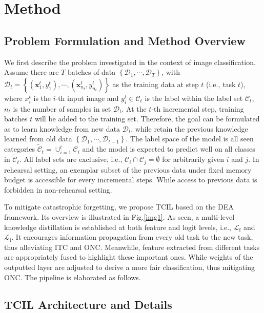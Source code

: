\documentclass[letterpaper]{article} %
\begin{document}
\section{Method}

\subsection{Problem Formulation and Method Overview}
We first describe the problem investigated in the context of image classification. Assume there are $T$ batches of data $\left\{\mathcal{D}_{1}, \cdots, \mathcal{D}_{T}\right\}$, with $\mathcal{D}_{t}=\left\{\left(\mathbf{x}_{1}^{t}, y_{1}^{t}\right), \cdots,\left(\mathbf{x}_{n_{t}}^{t}, y_{n_{t}}^{t}\right)\right\}$ as the training data at step $t$ (i.e., task $t$), where ${x}_{i}^{t}$ is the $i$-th input image and $y_{i}^{t} \in \mathcal{C}_{t}$ is the label within the label set $\mathcal{C}_{t}$, $n_{t}$ is the number of samples in set $\mathcal{D}_{t}$. At the $t$-th incremental step, training batches $t$ will be added to the training set. Therefore, the goal can be formulated as to learn knowledge from new data $\mathcal{D}_{t}$, while retain the previous knowledge learned from old data $\left\{\mathcal{D}_{1}, \cdots, \mathcal{D}_{t-1}\right\}$. The label space of the model is all seen categories $\tilde{\mathcal{C}}_{t}=\cup_{i=1}^{t} \mathcal{C}_{i}$ and the model is expected to predict well on all classes in $\tilde{\mathcal{C}}_{t}$. All label sets are exclusive, i.e., $\mathcal{C}_{i} \cap \mathcal{C}_{j}=\emptyset$ for arbitrarily given $i$ and $j$. In rehearsal setting, an exemplar subset of the previous data under fixed memory budget is accessible for every incremental steps. While access to previous data is forbidden in non-rehearsal setting.

To mitigate catastrophic forgetting, we propose TCIL based on the DEA framework. Its overview is illustrated in Fig.\ref{img1}. As seen, a multi-level knowledge distillation is established at both feature and logit levels, i.e., $\mathcal{L}_{\mathrm{f}}$ and $\mathcal{L}_{\mathrm{l}}$. It encourages information propagation from every old task to the new task, thus alleviating ITC and ONC. Meanwhile, feature extracted from different tasks are appropriately fused to highlight these important ones. While weights of the outputted layer are adjusted to derive a more fair classification, thus mitigating ONC. The pipeline is elaborated as follows.

\subsection{TCIL Architecture and Details}
\end{document}
